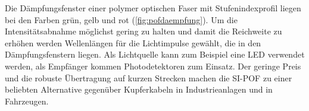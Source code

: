 Die Dämpfungsfenster einer polymer optischen Faser mit Stufenindexprofil liegen
bei den Farben grün, gelb und rot (\autoref{fig:pofdaempfung}). Um die
Intensitätsabnahme möglichst gering zu halten und damit die Reichweite zu
erhöhen werden Wellenlängen für die Lichtimpulse gewählt, die in den
Dämpfungsfenstern liegen. Als Lichtquelle kann zum Beispiel eine LED verwendet
werden, als Empfänger kommen Photodetektoren zum Einsatz. Der geringe Preis und
die robuste Übertragung auf kurzen Strecken machen die SI-POF zu einer beliebten
Alternative gegenüber Kupferkabeln in Industrieanlagen und in Fahrzeugen.
\cite{poflee}
